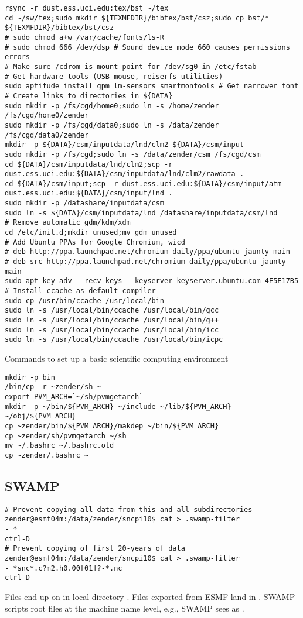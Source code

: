 \documentclass[12pt,twoside]{article}
\begin{document}
\begin{verbatim}
rsync -r dust.ess.uci.edu:tex/bst ~/tex
cd ~/sw/tex;sudo mkdir ${TEXMFDIR}/bibtex/bst/csz;sudo cp bst/* ${TEXMFDIR}/bibtex/bst/csz
# sudo chmod a+w /var/cache/fonts/ls-R
# sudo chmod 666 /dev/dsp # Sound device mode 660 causes permissions errors
# Make sure /cdrom is mount point for /dev/sg0 in /etc/fstab
# Get hardware tools (USB mouse, reiserfs utilities)
sudo aptitude install gpm lm-sensors smartmontools # Get narrower font
# Create links to directories in ${DATA}
sudo mkdir -p /fs/cgd/home0;sudo ln -s /home/zender /fs/cgd/home0/zender
sudo mkdir -p /fs/cgd/data0;sudo ln -s /data/zender /fs/cgd/data0/zender
mkdir -p ${DATA}/csm/inputdata/lnd/clm2 ${DATA}/csm/input
sudo mkdir -p /fs/cgd;sudo ln -s /data/zender/csm /fs/cgd/csm
cd ${DATA}/csm/inputdata/lnd/clm2;scp -r dust.ess.uci.edu:${DATA}/csm/inputdata/lnd/clm2/rawdata .
cd ${DATA}/csm/input;scp -r dust.ess.uci.edu:${DATA}/csm/input/atm dust.ess.uci.edu:${DATA}/csm/input/lnd .
sudo mkdir -p /datashare/inputdata/csm
sudo ln -s ${DATA}/csm/inputdata/lnd /datashare/inputdata/csm/lnd
# Remove automatic gdm/kdm/xdm
cd /etc/init.d;mkdir unused;mv gdm unused
# Add Ubuntu PPAs for Google Chromium, wicd
# deb http://ppa.launchpad.net/chromium-daily/ppa/ubuntu jaunty main 
# deb-src http://ppa.launchpad.net/chromium-daily/ppa/ubuntu jaunty main 
sudo apt-key adv --recv-keys --keyserver keyserver.ubuntu.com 4E5E17B5
# Install ccache as default compiler
sudo cp /usr/bin/ccache /usr/local/bin
sudo ln -s /usr/local/bin/ccache /usr/local/bin/gcc
sudo ln -s /usr/local/bin/ccache /usr/local/bin/g++
sudo ln -s /usr/local/bin/ccache /usr/local/bin/icc
sudo ln -s /usr/local/bin/ccache /usr/local/bin/icpc
\end{verbatim}

Commands to set up a basic scientific computing environment
\begin{verbatim}
mkdir -p bin
/bin/cp -r ~zender/sh ~
export PVM_ARCH=`~/sh/pvmgetarch`
mkdir -p ~/bin/${PVM_ARCH} ~/include ~/lib/${PVM_ARCH} ~/obj/${PVM_ARCH}
cp ~zender/bin/${PVM_ARCH}/makdep ~/bin/${PVM_ARCH}
cp ~zender/sh/pvmgetarch ~/sh
mv ~/.bashrc ~/.bashrc.old
cp ~zender/.bashrc ~
\end{verbatim}

\subsection{SWAMP}\label{sxn:swamp}
\begin{verbatim}
# Prevent copying all data from this and all subdirectories
zender@esmf04m:/data/zender/sncpi10$ cat > .swamp-filter
- *
ctrl-D
# Prevent copying of first 20-years of data
zender@esmf04m:/data/zender/sncpi10$ cat > .swamp-filter
- *snc*.c?m2.h0.00[01]?-*.nc
ctrl-D
\end{verbatim}
Files end up on  in local directory
.
Files exported from ESMF land in 
.
SWAMP scripts root files at the machine name level, e.g.,
SWAMP sees  as
.
\end{document}

